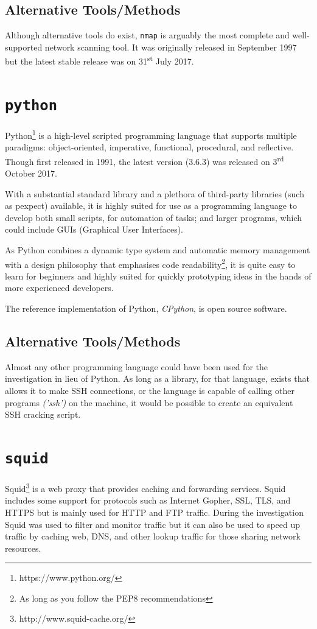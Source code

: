 \documentclass[12pt]{report}
\begin{document}
\subsection*{Alternative Tools/Methods}
Although alternative tools do exist, \texttt{nmap} is arguably the most complete and well-supported network scanning tool. It was originally released in September 1997 but the latest stable release was on 31\textsuperscript{st} July 2017.

\section{\texttt{python}}
Python\footnote{https://www.python.org/} is a high-level scripted programming language that supports multiple paradigms: object-oriented, imperative, functional, procedural, and reflective. Though first released in 1991, the latest version (3.6.3) was released on 3\textsuperscript{rd} October 2017.

With a substantial standard library and a plethora of third-party libraries (such as pexpect) available, it is highly suited for use as a programming language to develop both small scripts, for automation of tasks; and larger programs, which could include GUIs (Graphical User Interfaces).

As Python combines a dynamic type system and automatic memory management with a design philosophy that emphasises code readability\footnote{As long as you follow the PEP8 recommendations}, it is quite easy to learn for beginners and highly suited for quickly prototyping ideas in the hands of more experienced developers.

The reference implementation of Python, \textit{CPython}, is open source software.
\subsection*{Alternative Tools/Methods}
Almost any other programming language could have been used for the investigation in lieu of Python. As long as a library, for that language, exists that allows it to make SSH connections, or the language is capable of calling other programs \textit{('ssh')} on the machine, it would be possible to create an equivalent SSH cracking script.

\section{\texttt{squid}}
Squid\footnote{http://www.squid-cache.org/} is a web proxy that provides caching and forwarding services. Squid includes some support for protocols such as Internet Gopher, SSL, TLS, and HTTPS but is mainly used for HTTP and FTP traffic. During the investigation Squid was used to filter and monitor traffic but it can also be used to speed up traffic by caching web, DNS, and other lookup traffic for those sharing network resources.
\end{document}
